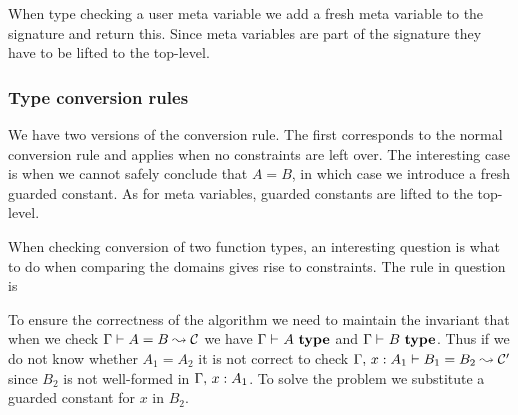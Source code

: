 When type checking a user meta variable we add a fresh meta variable to the
signature and return this. Since meta variables are part of the signature they
have to be lifted to the top-level.

\subsubsection{Type conversion rules}

We have two versions of the conversion rule. The first corresponds to the
normal conversion rule and applies when no constraints are left over. The
interesting case is when we cannot safely conclude that $A = B$, in which case
we introduce a fresh guarded constant. As for meta variables, guarded constants
are lifted to the top-level.

When checking conversion of two function types, an interesting question is what
to do when comparing the domains gives rise to constraints. The rule in question is


To ensure the correctness of the algorithm we need to maintain the invariant
that when we check ${\Gamma} \vdash {A} = {B} \leadsto {\mathcal{C}}$ we have ${\Gamma} \vdash_{}A ~ \mathbf{type}$ and
${\Gamma} \vdash_{}B ~ \mathbf{type}$. Thus if we do not know whether $A_1 = A_2$ it is not
correct to check ${{\Gamma},\,{} x : A_1} \vdash {B_1} = {B_2} \leadsto {\mathcal{C}^\prime}$
since $B_2$ is not well-formed in ${\Gamma},\,{} x : A_1$. To solve the problem
we substitute a guarded constant for $x$ in $B_2$.

% 
% 
% 
% 
% 

